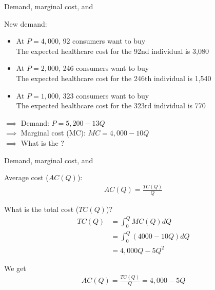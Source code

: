 \begin{frame}{Demand, marginal cost, and }

    New demand:
    \begin{itemize}
        \item At $P=4,000$, 92 consumers want to buy\\
        {\color{blue} The expected healthcare cost for the 92nd individual is 3,080}
        \item At $P=2,000$, 246 consumers want to buy\\
        {\color{blue} The expected healthcare cost for the 246th individual is 1,540}
        \item At $P=1,000$, 323 consumers want to buy\\
        {\color{blue} The expected healthcare cost for the 323rd individual is 770}
    \end{itemize}
    $\implies$ Demand: $P = 5,200 - 13Q$\\
    $\implies$ Marginal cost (MC): $MC = 4,000 - 10Q$\\
    $\implies$ What is the ?
\end{frame}
\begin{frame}{Demand, marginal cost, and }

    Average cost ($AC(Q)$):
    \begin{align*}
        AC(Q) = \frac{TC(Q)}{Q}
    \end{align*}

    What is the total cost ($TC(Q)$)?
    \begin{align*}
        TC(Q) &= \int_0^Q MC(Q) dQ\\
        &= \int_0^Q (4000 - 10Q) dQ\\
        &= 4,000 Q - 5 Q^2
    \end{align*}

    We get
    \begin{align*}
        AC(Q) = \frac{TC(Q)}{Q} = 4,000 - 5 Q
    \end{align*}

\end{frame}
